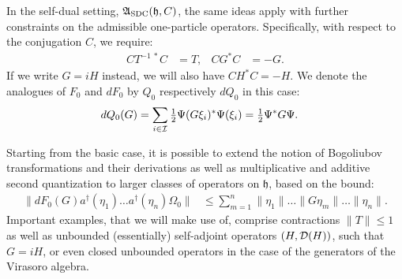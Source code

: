 \documentclass[a4paper, 11pt]{article}
\newcommand{\fA}{\mathfrak{A}}\newcommand{\cA}{\mathcal{A}}\newcommand{\dA}{\mathds{A}}\newcommand{\sA}{\mathscr{A}}
\newcommand{\fh}{\mathfrak{h}}
\DeclareMathOperator{\1}{\mathds{1}}
\DeclareMathOperator{\SDC}{\textup{SDC}}
\begin{document}
In the self-dual setting, $\fA_{\SDC}(\fh,C)$, the same ideas apply with further constraints on the admissible one-particle operators. Specifically, with respect to the conjugation $C$, we require:
\begin{align}
\label{eq:sdcconstraints}
CT^{-1\!\ *}C & = T, & CG^{*}C & = -G.
\end{align}
If we write $G = iH$ instead, we will also have $CH^{*}C=-H$. We denote the analogues of $F_{0}$ and $dF_{0}$ by $Q_{0}$ respectively $dQ_{0}$ in this case:
\begin{align}
\label{eq:secondquantarakisdc}
dQ_{0}(G) & = \sum_{i\in\mathcal{I}}\tfrac{1}{2}\Psi(G\xi_{i})^{*}\Psi(\xi_{i}) = \tfrac{1}{2}\Psi^{*}G\Psi.
\end{align}

Starting from the basic case, it is possible to extend the notion of Bogoliubov transformations and their derivations as well as multiplicative and additive second quantization to larger classes of operators on $\fh$, based on the bound:
\begin{align}
\label{eq:secondquantboundvect}
\|dF_{0}(G)a^{\dag}(\eta_{1})\dots a^{\dag}(\eta_{n})\Omega_{0}\| & \leq \sum_{m=1}^{n}\|\eta_{1}\|\dots\|G\eta_{m}\|\dots\|\eta_{n}\|.
\end{align}
Important examples, that we will make use of, comprise contractions $\|T\|\leq1$ as well as unbounded (essentially) self-adjoint operators $(H,\mathcal{D}(H))$, such that $G = iH$, or even closed unbounded operators in the case of the generators of the Virasoro algebra.
\end{document}
